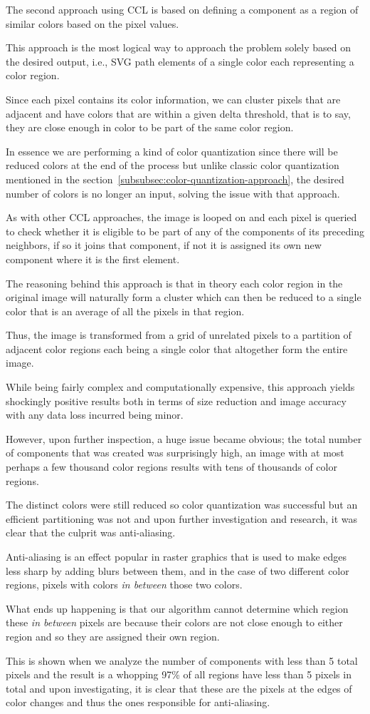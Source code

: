 \documentclass[12pt]{article}
\newcommand{\sentence}{} %
\newcommand{\italic}[1]{\textit{#1}}
\renewcommand{\fullref}[1]{\ref{#1}\nameref{#1}}
\begin{document}
    \tab
    The second approach using CCL is based on defining a component as a region of similar colors based on the pixel
    values.
    \sentence
    This approach is the most logical way to approach the problem solely based on the desired output, i.e., SVG path
    elements of a single color each representing a color region.
    \sentence
    Since each pixel contains its color information, we can cluster pixels that are adjacent and have colors that are
    within a given delta threshold, that is to say, they are close enough in color to be part of the same color
    region.
    \sentence
    In essence we are performing a kind of color quantization since there will be reduced colors at the end of the
    process but unlike classic color quantization mentioned in the
    section~\fullref{subsubsec:color-quantization-approach}, the desired number of colors is no longer an input,
    solving the issue with that approach.
    \sentence
    As with other CCL approaches, the image is looped on and each pixel is queried to check whether it is eligible to
    be part of any of the components of its preceding neighbors, if so it joins that component, if not it is assigned
    its own new component where it is the first element.
    \sentence
    The reasoning behind this approach is that in theory each color region in the original image will naturally form
    a cluster which can then be reduced to a single color that is an average of all the pixels in that region.
    \sentence
    Thus, the image is transformed from a grid of unrelated pixels to a partition of adjacent color regions each
    being a single color that altogether form the entire image.
    \sentence

    \bigskip
    While being fairly complex and computationally expensive, this approach yields shockingly positive results both
    in terms of size reduction and image accuracy with any data loss incurred being minor.
    \sentence
    However, upon further inspection, a huge issue became obvious;
    the total number of components that was created was surprisingly high, an image with at most perhaps a few
    thousand color regions results with tens of thousands of color regions.
    \sentence
    The distinct colors were still reduced so color quantization was successful but an efficient partitioning was not
    and upon further investigation and research, it was clear that the culprit was anti-aliasing.
    \sentence
    Anti-aliasing is an effect popular in raster graphics that is used to make edges less sharp by adding blurs
    between them, and in the case of two different color regions, pixels with colors \italic{in between} those two
    colors.
    \sentence
    What ends up happening is that our algorithm cannot determine which region these \italic{in between} pixels are
    because their colors are not close enough to either region and so they are assigned their own region.
    \sentence
    This is shown when we analyze the number of components with less than 5 total pixels and the result is a whopping
    97\% of all regions have less than 5 pixels in total and upon investigating, it is clear that these are the
    pixels at the edges of color changes and thus the ones responsible for anti-aliasing.
    \sentence
\end{document}
